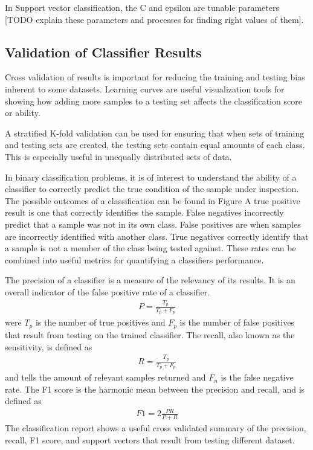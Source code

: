 In Support vector classification, the C and epsilon are tunable parameters [TODO explain these parameters and processes for finding right values of them].
\subsection{Validation of Classifier Results}
Cross validation of results is important for reducing the training and testing bias inherent to some datasets.  Learning curves are useful visualization tools for showing how adding more samples to a testing set affects the classification score or ability.

A stratified K-fold validation can be used for ensuring that when sets of training and testing sets are created, the testing sets contain equal amounts of each class.  This is especially useful in unequally distributed sets of data.

In binary classification problems, it is of interest to understand the ability of a classifier to correctly predict the true condition of the sample under inspection.  The possible outcomes of a classification can be found in Figure
A true positive result is one that correctly identifies the sample.  False negatives incorrectly predict that a sample was not in its own class.  False positives are when samples are incorrectly identified with another class.  True negatives correctly identify that a sample is not a member of the class being tested against.   These rates can be combined into useful metrics for quantifying a classifiers performance.

The precision of a classifier is a measure of the relevancy of its results.  It is an overall indicator of the false positive rate of a classifier.
%
\begin{align}
    P = \frac{T_p}{T_p + F_p}
\end{align}
%
were $T_p$ is the number of true positives and $F_p$ is the number of false positives that result from testing on the trained classifier.  The recall, also known as the sensitivity, is defined as
%
\begin{align}
    R = \frac{T_p}{T_p + F_p}
\end{align}
%
and tells the amount of relevant samples returned and $F_n$ is the false negative rate.  The F1 score is the harmonic mean between the precision and recall, and is defined as
%
\begin{align}
    F1 = 2\frac{PR}{P + R}
\end{align}
%
The classification report shows a useful cross validated summary of the precision, recall, F1 score, and support vectors that result from testing different dataset.

